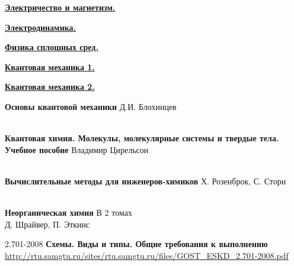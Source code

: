 \begin{thebibliography}{99}
\href{https://drive.google.com/file/d/0B0u4WeMjO894dGdvM19ZUTh0UGM/view?usp=sharing}{\textbf{Электричество и магнетизм.}}

 \href{}{\textbf{Электродинамика.}}

 \href{}{\textbf{Физика сплошных сред.}}

 \href{}{\textbf{Квантовая механика 1.}}

 \href{}{\textbf{Квантовая механика 2.}}

\textbf{Основы квантовой механики}
Д.И. Блохинцев


\ \\
\textbf{Квантовая химия. Молекулы, молекулярные системы и твердые тела. Учебное
пособие}
Владимир Цирельсон

\ \\
\textbf{Вычислительные методы для инженеров-химиков}
Х. Розенброк, С. Стори

\ \\
\textbf{Неорганическая химия} В 2 томах\\
Д. Шрайвер, П. Эткинс


2.701-2008 \textbf{Схемы. Виды и типы. Общие требования к выполнению}\\
\url{http://rtu.samgtu.ru/sites/rtu.samgtu.ru/files/GOST_ESKD_2.701-2008.pdf}

\end{thebibliography}
